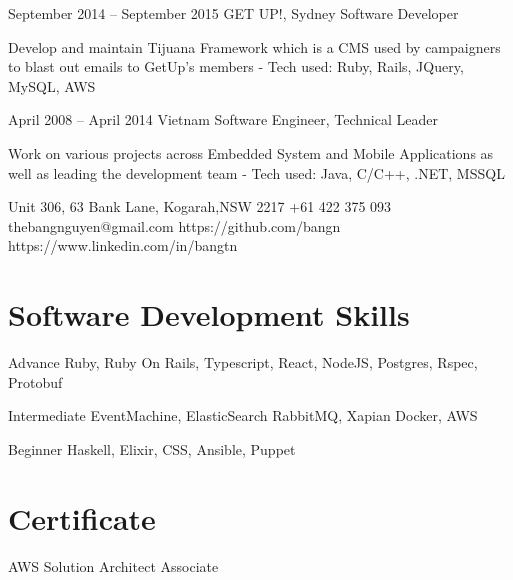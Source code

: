 \documentclass{tccv}
\begin{document}
\begin{eventlist}
\item{September 2014 -- September 2015}
    {GET UP!, Sydney}
    {Software Developer}

    Develop and maintain Tijuana Framework which is a CMS
    used by campaigners to blast out emails to GetUp's members
    \newline- Tech used: Ruby, Rails, JQuery, MySQL, AWS

\item{April 2008 -- April 2014}
    {Vietnam}
    {Software Engineer, Technical Leader}

    Work on various projects across Embedded System and Mobile Applications as well as leading the development team
    \newline- Tech used: Java, C/C++, .NET, MSSQL

\end{eventlist}

\personal
    {Unit 306, 63 Bank Lane, Kogarah,\newline NSW 2217}
    {+61 422 375 093}
    {thebangnguyen@gmail.com}
    {https://github.com/bangn}
    {https://www.linkedin.com/in/bangtn}

\section{Software Development Skills}

\begin{factlist}

\item{Advance}
    {Ruby, Ruby On Rails, Typescript, React, NodeJS, Postgres, Rspec, Protobuf}

\item{Intermediate}
    {EventMachine, ElasticSearch
    \newline RabbitMQ, Xapian
    \newline Docker, AWS}

\item{Beginner}
    {Haskell, Elixir, CSS, Ansible, Puppet}
\end{factlist}

\section{Certificate}

\begin{factlist}

\item{AWS Solution Architect}
    {Associate}

\end{factlist}
\end{document}
